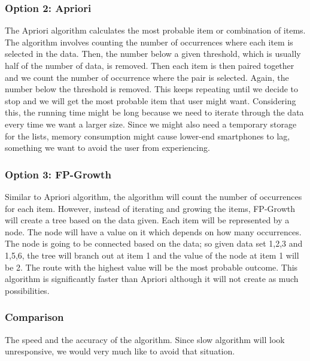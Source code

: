 \documentclass[journal,compsoc, 10pt, draftclsnofoot, onecolumn]{IEEEtran}
\begin{document}
\subsubsection*{Option 2: Apriori}
The Apriori algorithm calculates the most probable item or combination of items. The
algorithm involves counting the number of occurrences where each item is selected in
the data. Then, the number below a given threshold, which is usually half of the
number of data, is removed. Then each item is then paired together and we count the
number of occurrence where the pair is selected. Again, the number below the
threshold is removed. This keeps repeating until we decide to stop and we will get
the most probable item that user might want. Considering this, the running time might
be long because we need to iterate through the data every time we want a larger size.
Since we might also need a temporary storage for the lists, memory consumption might
cause lower-end smartphones to lag, something we want to avoid the user from
experiencing.

\subsubsection*{Option 3: FP-Growth}
Similar to Apriori algorithm, the algorithm will count the number of occurrences for
each item. However, instead of iterating and growing the items, FP-Growth will create
a tree based on the data given. Each item will be represented by a node. The node
will have a value on it which depends on how many occurrences. The node is going to
be connected based on the data; so given data set {1,2,3} and {1,5,6}, the tree will
branch out at item 1 and the value of the node at item 1 will be 2. The route with
the highest value will be the most probable outcome. This algorithm is significantly
faster than Apriori although it will not create as much possibilities.

\subsubsection{Comparison}
The speed and the accuracy of the algorithm. Since slow algorithm will look
unresponsive, we would very much like to avoid that situation.
\end{document}
